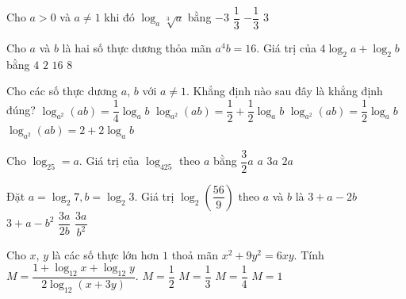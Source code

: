 \begin{ex}%
	Cho $a>0$ và $a\ne 1$ khi đó  $\log_a\sqrt[3]{a}$ bằng
	\choice 
		 {$-3$}
		 {\True $\dfrac{1}{3}$}
		 {$-\dfrac{1}{3}$}
		 {$3$}
\end{ex}

\begin{ex}%
	Cho $a$ và $b$ là hai  số thực dương thỏa mãn $a^4 b=16$. Giá trị của $4\log_2 a+\log_2 b$ bằng
	 \choice
		 {\True $4$}
		 {$2$}
		{$16$} 
		{$8$} 
\end{ex}

\begin{ex}%
	Cho các số thực dương  $a$, $b$ với $a\ne 1$. Khẳng định nào sau đây là khẳng định đúng?
	\choice 
		{$\log _{a^2}  \left(ab\right)=\dfrac{1}{4} \log_a b$}
		{\True$\log _{a^2} \left(ab\right)=\dfrac{1}{2}+\dfrac{1}{2} \log_a b$  }
		 {$\log _{a^2} \left(ab\right)=\dfrac{1}{2} \log_a b$}
		 {$\log _{a^2} \left(ab\right)=2+2\log_a b$}
\end{ex}

\begin{ex}%
	Cho $\log_25=a$. Giá trị của $\log_425$  theo $ a$ bằng
	 \choice
		 {$\dfrac{3}{2}a$}
		{\True  $a$}
		{$  3a$}
		{$  2a$}
\end{ex}

\begin{ex}%
	 Đặt $a=\log _2 7, b=\log _2 3$. Giá trị $\log _2\left(\dfrac{56}{9}\right)$ theo $a$ và $b$ là
	 \choice
		{\True $3+a-2  b$}
		 {$3+a-b^2$}
		 {$\dfrac{3 a}{2 b}$}
		{$\dfrac{3  a}{b^2}$}
\end{ex}

\begin{ex}%
	[Mã 110 2017] Cho $x$, $y$ là các số thực lớn hơn $1$  thoả mãn $x^2+9y^2=6xy$. Tính $M=\dfrac{1+\log_{12}x+\log_{12}y}{2\log_{12}(x+3y)}$.
	\choice 
		 {$M=\dfrac{1}{2}$}
		{$M=\dfrac{1}{3}$} 
		 {$M=\dfrac{1}{4}$}
		{\True $M=1$} 
\end{ex}

